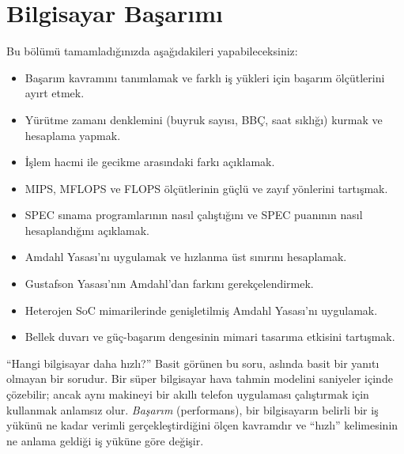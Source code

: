 \chapter{Bilgisayar Başarımı}
\label{chap:basarim}

\begin{tcolorbox}[
    colback=blokyesil!15,
    colframe=sinyalyesil!60!black,
    title={\textbf{Öğrenme Hedefleri}},
    fonttitle=\bfseries,
    rounded corners,
    boxrule=0.8pt
]
Bu bölümü tamamladığınızda aşağıdakileri yapabileceksiniz:
\begin{itemize}[nosep, leftmargin=*]
    \item Başarım kavramını tanımlamak ve farklı iş yükleri için başarım ölçütlerini ayırt etmek.
    \item Yürütme zamanı denklemini (buyruk sayısı, BBÇ, saat sıklığı) kurmak ve hesaplama yapmak.
    \item İşlem hacmi ile gecikme arasındaki farkı açıklamak.
    \item MIPS, MFLOPS ve FLOPS ölçütlerinin güçlü ve zayıf yönlerini tartışmak.
    \item SPEC sınama programlarının nasıl çalıştığını ve SPEC puanının nasıl hesaplandığını açıklamak.
    \item Amdahl Yasası'nı uygulamak ve hızlanma üst sınırını hesaplamak.
    \item Gustafson Yasası'nın Amdahl'dan farkını gerekçelendirmek.
    \item Heterojen SoC mimarilerinde genişletilmiş Amdahl Yasası'nı uygulamak.
    \item Bellek duvarı ve güç-başarım dengesinin mimari tasarıma etkisini tartışmak.
\end{itemize}
\end{tcolorbox}

``Hangi bilgisayar daha hızlı?'' Basit görünen bu soru, aslında basit bir yanıtı olmayan bir sorudur. Bir süper bilgisayar hava tahmin modelini saniyeler içinde çözebilir; ancak aynı makineyi bir akıllı telefon uygulaması çalıştırmak için kullanmak anlamsız olur. \emph{Başarım} (performans), bir bilgisayarın belirli bir iş yükünü ne kadar verimli gerçekleştirdiğini ölçen kavramdır ve ``hızlı'' kelimesinin ne anlama geldiği iş yüküne göre değişir.

